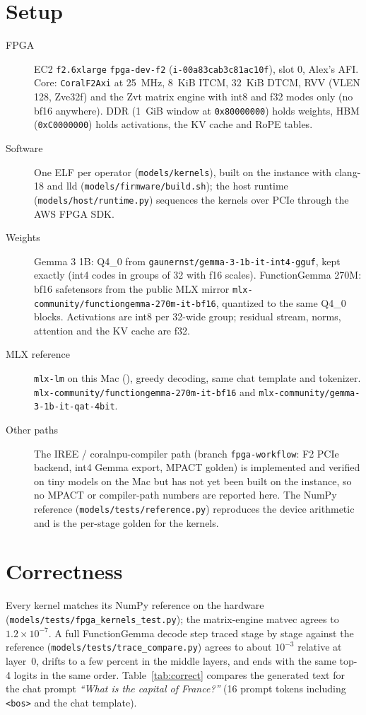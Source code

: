 \documentclass[11pt]{article}
\begin{document}
\section{Setup}
\begin{description}
  \item[FPGA] EC2 \texttt{f2.6xlarge} \texttt{fpga-dev-f2} (\texttt{i-00a83cab3c81ac10f}), slot 0,
    Alex's AFI. Core: \texttt{CoralF2Axi} at 25~MHz, 8~KiB ITCM, 32~KiB DTCM, RVV (VLEN 128,
    Zve32f) and the Zvt matrix engine with int8 and f32 modes only (no bf16 anywhere). DDR
    (1~GiB window at \texttt{0x80000000}) holds weights, HBM (\texttt{0xC0000000}) holds
    activations, the KV cache and RoPE tables.
  \item[Software] One ELF per operator (\texttt{models/kernels}), built on the instance with
    clang-18 and lld (\texttt{models/firmware/build.sh}); the host runtime
    (\texttt{models/host/runtime.py}) sequences the kernels over PCIe through the AWS FPGA SDK.
  \item[Weights] Gemma 3 1B: Q4\_0 from \texttt{gaunernst/gemma-3-1b-it-int4-gguf}, kept exactly
    (int4 codes in groups of 32 with f16 scales). FunctionGemma 270M: bf16 safetensors from the
    public MLX mirror \texttt{mlx-community/functiongemma-270m-it-bf16}, quantized to the same
    Q4\_0 blocks. Activations are int8 per 32-wide group; residual stream, norms, attention and
    the KV cache are f32.
  \item[MLX reference] \texttt{mlx-lm} on this Mac (\macinfo), greedy decoding, same chat template
    and tokenizer. \texttt{mlx-community/functiongemma-270m-it-bf16} and
    \texttt{mlx-community/gemma-3-1b-it-qat-4bit}.
  \item[Other paths] The IREE / coralnpu-compiler path (branch \texttt{fpga-workflow}: F2 PCIe
    backend, int4 Gemma export, MPACT golden) is implemented and verified on tiny models on the Mac
    but has not yet been built on the instance, so no MPACT or compiler-path numbers are reported
    here. The NumPy reference (\texttt{models/tests/reference.py}) reproduces the device
    arithmetic and is the per-stage golden for the kernels.
\end{description}

\section{Correctness}
Every kernel matches its NumPy reference on the hardware
(\texttt{models/tests/fpga\_kernels\_test.py}); the matrix-engine matvec agrees to $1.2\times10^{-7}$.
A full FunctionGemma decode step traced stage by stage against the reference
(\texttt{models/tests/trace\_compare.py}) agrees to about $10^{-3}$ relative at layer~0, drifts to a
few percent in the middle layers, and ends with the same top-4 logits in the same order.
Table~\ref{tab:correct} compares the generated text for the chat prompt
\emph{``What is the capital of France?''} (16 prompt tokens including \texttt{<bos>} and the chat
template).
\end{document}
